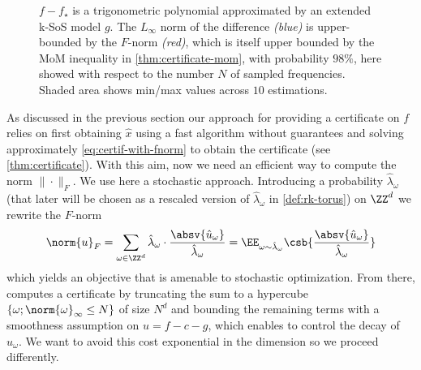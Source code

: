 \documentclass{article}
\begin{document}
\begin{figure}
  \vspace{-1cm}
  \centering
  
  \vspace{-.7cm}
  \caption{$f - f_\star$ is a trigonometric polynomial approximated by an extended k-SoS model $g$. The $L_\infty$ norm of the difference \emph{(blue)} is upper-bounded by the $F$-norm \emph{(red)}, which is itself upper bounded by the MoM inequality in \cref{thm:certificate-mom}, with probability $98\%$, here showed with respect to the number $N$ of sampled frequencies. Shaded area shows min/max values across $10$ estimations.}
  \vspace{-.7cm}
  \label{fig:fourier_fnorm}
\end{figure}

As discussed in the previous section our approach for providing a certificate on $f$ relies on first obtaining $\widehat{x}$ using a fast algorithm without guarantees and solving approximately \cref{eq:certif-with-fnorm} to obtain the certificate (see \cref{thm:certificate}). With this aim, now we need an efficient way to compute the norm $\|\cdot\|_F$. We use here a stochastic approach. Introducing a probability $\hat{\lambda}_\omega$ (that later will be chosen as a rescaled version of $\hat{\lambda}_\omega$ in \cref{def:rk-torus}) on $\ZZ^d$ we rewrite the $F$-norm
\begin{equation}\label{eq:fnorm-expectation}
  \norm{u}_F = \sum_{\omega \in \ZZ^d} \hat{\lambda}_\omega \cdot \frac{\absv{\hat{u}_\omega}}{\hat{\lambda}_\omega} = \EE_{\omega \sim \hat{\lambda}_\omega} \csb{\frac{\absv{\hat{u}_\omega}}{\hat{\lambda}_\omega}}
\end{equation}
which yields an objective that is amenable to stochastic optimization. From there, \cite{woodworthNonConvexOptimizationCertificates2022} computes a certificate by truncating the sum to a hypercube $\{ \omega; \norm{\omega}_{\infty} \leq N \}$ of size $N^d$ and bounding the remaining terms with a smoothness assumption on $u = f - c - g$, which enables to control the decay of $\hat{u}_\omega$. We want to avoid this cost exponential in the dimension so we proceed differently.
\end{document}
